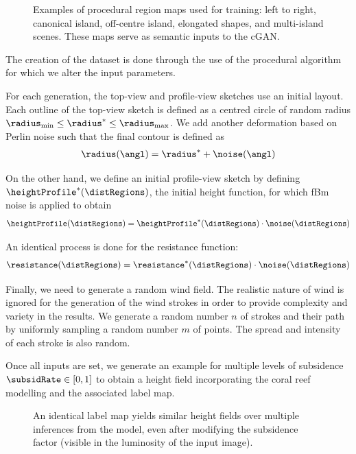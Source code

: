 \begin{figure}
\caption{Examples of procedural region maps used for training: left to right, canonical island, off-centre island, elongated shapes, and multi-island scenes. These maps serve as semantic inputs to the cGAN.}
\label{fig:coral-island-difficulties-dataset}
\end{figure}

The creation of the dataset is done through the use of the procedural algorithm for which we alter the input parameters.

For each generation, the top-view and profile-view sketches use an initial layout. Each outline of the top-view sketch is defined as a centred circle of random radius $\radius_\text{min} \leq \radius^* \leq \radius_\text{max}$. We add another deformation based on Perlin noise such that the final contour is defined as
\begin{align}
\radius(\angl) = \radius^* + \noise(\angl)
\end{align}

On the other hand, we define an initial profile-view sketch by defining $\heightProfile^*(\distRegions)$, the initial height function, for which fBm noise is applied to obtain
\begin{align}
\heightProfile(\distRegions) = \heightProfile^*(\distRegions) \cdot \noise(\distRegions)
\end{align}

An identical process is done for the resistance function:
\begin{align}
\resistance(\distRegions) = \resistance^*(\distRegions) \cdot \noise(\distRegions)
\end{align}

Finally, we need to generate a random wind field. The realistic nature of wind is ignored for the generation of the wind strokes in order to provide complexity and variety in the results.
We generate a random number $n$ of strokes and their path by uniformly sampling a random number $m$ of points. The spread and intensity of each stroke is also random.

Once all inputs are set, we generate an example for multiple levels of subsidence $\subsidRate \in [0, 1]$ to obtain a height field incorporating the coral reef modelling and the associated label map.

\begin{figure}
\caption{An identical label map yields similar height fields over multiple inferences from the model, even after modifying the subsidence factor (visible in the luminosity of the input image).}
\label{fig:coral-island-results-subsidence}
\end{figure}

